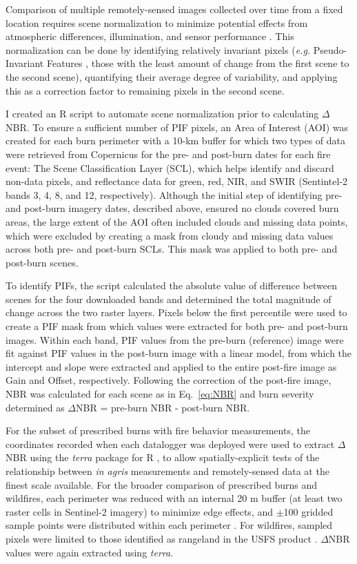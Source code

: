 \documentclass[fire,article,submit,oneauthor,pdftex]{Definitions/mdpi}
\begin{document}
Comparison of multiple remotely-sensed images collected over time from a fixed location requires scene normalization to minimize potential effects from atmospheric differences, illumination, and sensor performance \cite{key2006a, schott1988}. 
This normalization can be done by identifying relatively invariant pixels (\emph{e.g.} Pseudo-Invariant Features \cite[PIF, ][]{schott1988}, those with the least amount of change from the first scene to the second scene), quantifying their average degree of variability, and applying this as a correction factor to remaining pixels in the second scene. 

I created an R script to automate scene normalization prior to calculating $\Delta$NBR. 
To ensure a sufficient number of PIF pixels, an Area of Interest (AOI) was created for each burn perimeter with a 10-km buffer for which two types of data were retrieved from Copernicus for the pre- and post-burn dates for each fire event: The Scene Classification Layer (SCL), which helps identify and discard non-data pixels, and reflectance data for green, red, NIR, and SWIR (Sentintel-2 bands 3, 4, 8, and 12, respectively).
Although the initial step of identifying pre- and post-burn imagery dates, described above, ensured no clouds covered burn areas, the large extent of the AOI often included clouds and missing data points, which were excluded by creating a mask from cloudy and missing data values across both pre- and post-burn SCLs. 
This mask was applied to both pre- and post-burn scenes. 

To identify PIFs, the script calculated the absolute value of difference between scenes for the four downloaded bands and determined the total magnitude of change across the two raster layers. 
Pixels below the first percentile were used to create a PIF mask from which values were extracted for both pre- and post-burn images. 
Within each band, PIF values from the pre-burn (reference) image were fit against PIF values in the post-burn image with a linear model, from which the intercept and slope were extracted and applied to the entire post-fire image as Gain and Offset, respectively. 
Following the correction of the post-fire image, NBR was calculated for each scene as in Eq.~\ref{eq:NBR} and burn severity determined as $\Delta$NBR = pre-burn NBR - post-burn NBR.

For the subset of prescribed burns with fire behavior measurements, the coordinates recorded when each datalogger was deployed were used to extract 	$\Delta$NBR using the \emph{terra} package for \textsf{R} \cite{hijmans2022}, to allow spatially-explicit tests of the relationship between \emph{in agris} measurements and remotely-sensed data at the finest scale available. 
For the broader comparison of prescribed burns and wildfires, each perimeter was reduced with an internal 20 m buffer (at least two raster cells in Sentinel-2 imagery) to minimize edge effects, and $\pm$100 gridded sample points were distributed within each perimeter \cite{mcgranahan2025}. 
For wildfires, sampled pixels were limited to those identified as rangeland in the USFS product \cite{usdaforestservicenodate}. 
$\Delta$NBR values were again extracted using \emph{terra}.
\end{document}
